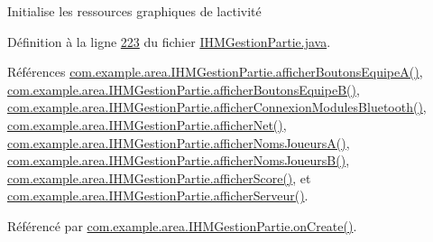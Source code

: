 Initialise les ressources graphiques de l\textquotesingle{}activité 



Définition à la ligne \hyperlink{_i_h_m_gestion_partie_8java_source_l00223}{223} du fichier \hyperlink{_i_h_m_gestion_partie_8java_source}{I\+H\+M\+Gestion\+Partie.\+java}.



Références \hyperlink{_i_h_m_gestion_partie_8java_source_l00265}{com.\+example.\+area.\+I\+H\+M\+Gestion\+Partie.\+afficher\+Boutons\+Equipe\+A()}, \hyperlink{_i_h_m_gestion_partie_8java_source_l00278}{com.\+example.\+area.\+I\+H\+M\+Gestion\+Partie.\+afficher\+Boutons\+Equipe\+B()}, \hyperlink{_i_h_m_gestion_partie_8java_source_l00242}{com.\+example.\+area.\+I\+H\+M\+Gestion\+Partie.\+afficher\+Connexion\+Modules\+Bluetooth()}, \hyperlink{_i_h_m_gestion_partie_8java_source_l00253}{com.\+example.\+area.\+I\+H\+M\+Gestion\+Partie.\+afficher\+Net()}, \hyperlink{_i_h_m_gestion_partie_8java_source_l00401}{com.\+example.\+area.\+I\+H\+M\+Gestion\+Partie.\+afficher\+Noms\+Joueurs\+A()}, \hyperlink{_i_h_m_gestion_partie_8java_source_l00418}{com.\+example.\+area.\+I\+H\+M\+Gestion\+Partie.\+afficher\+Noms\+Joueurs\+B()}, \hyperlink{_i_h_m_gestion_partie_8java_source_l00435}{com.\+example.\+area.\+I\+H\+M\+Gestion\+Partie.\+afficher\+Score()}, et \hyperlink{_i_h_m_gestion_partie_8java_source_l00447}{com.\+example.\+area.\+I\+H\+M\+Gestion\+Partie.\+afficher\+Serveur()}.



Référencé par \hyperlink{_i_h_m_gestion_partie_8java_source_l00106}{com.\+example.\+area.\+I\+H\+M\+Gestion\+Partie.\+on\+Create()}.


